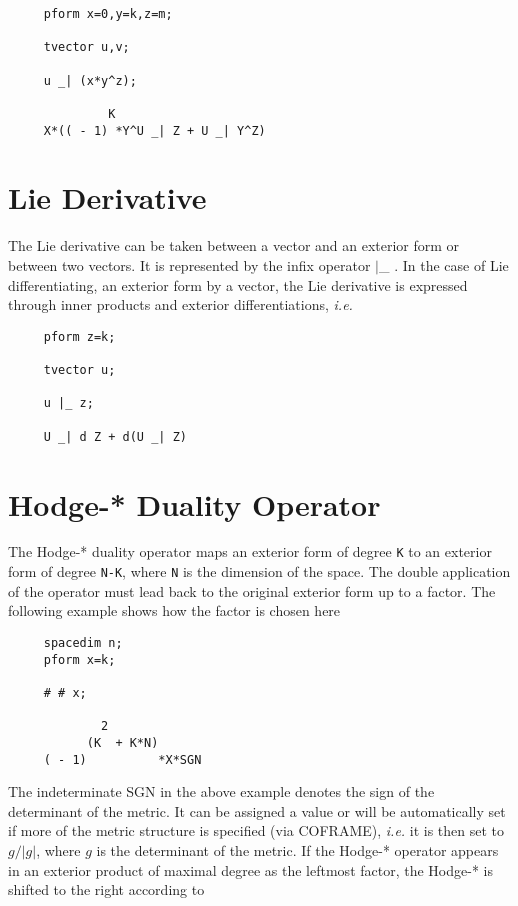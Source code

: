 \example{}

\begin{verbatim}
     pform x=0,y=k,z=m;

     tvector u,v;

     u _| (x*y^z);

              K
     X*(( - 1) *Y^U _| Z + U _| Y^Z)
\end{verbatim}

\section{Lie Derivative}

The Lie derivative can be taken between a vector and an exterior form
or between two vectors.  It is represented by the infix operator $|$\_
\label{lie}.  In the case of Lie differentiating, an exterior form by
a vector, the Lie derivative is expressed through inner products and
exterior differentiations, {\em i.e.}

\begin{verbatim}
     pform z=k;

     tvector u;

     u |_ z;

     U _| d Z + d(U _| Z)
\end{verbatim}

\section{Hodge-* Duality Operator}

The Hodge-*\label{hodge} duality operator maps an exterior form of degree
{\tt K} to an exterior form of degree {\tt N-K}, where {\tt N} is the
dimension of the space.  The double application of the operator must
lead back to the original exterior form up to a factor. The following
example shows how the factor is chosen here

\begin{verbatim}
     spacedim n;
     pform x=k;

     # # x;

             2
           (K  + K*N)
     ( - 1)          *X*SGN
\end{verbatim}

The indeterminate SGN in the above example denotes the sign of the
determinant of the metric. It can be assigned a value or will be
automatically set if more of the metric structure is specified (via
COFRAME), {\em i.e.} it is then set to $g/|g|$, where $g$ is the
determinant of the metric.  If the Hodge-* operator appears in an
exterior product of maximal degree as the leftmost factor, the Hodge-*
is shifted to the right according to

